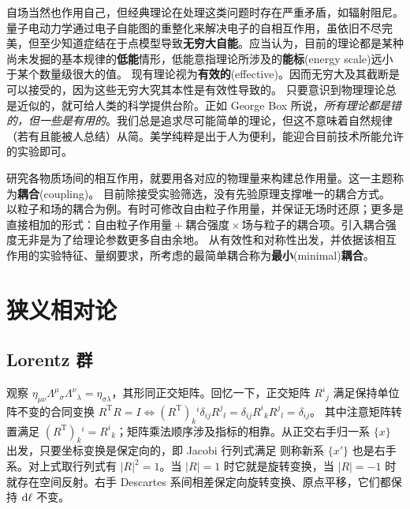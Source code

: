 自场当然也作用自己，但经典理论在处理这类问题时存在严重矛盾，如辐射阻尼。量子电动力学通过电子自能图的重整化来解决电子的自相互作用，虽依旧不尽完美，但至少知道症结在于点模型导致\textbf{无穷大自能}。应当认为，目前的理论都是某种尚未发掘的基本规律的\textbf{低能}情形，低能意指理论所涉及的\textbf{能标}(energy scale)远小于某个数量级很大的值。
现有理论视为\textbf{有效的}(effective)。因而无穷大及其截断是可以接受的，因为这些无穷大究其本性是有效性导致的。
只要意识到物理理论总是近似的，就可给人类的科学提供台阶。正如 George Box 所说，\textit{所有理论都是错的，但一些是有用的}。我们总是追求尽可能简单的理论，但这不意味着自然规律（若有且能被人总结）从简。美学纯粹是出于人为便利，能迎合目前技术所能允许的实验即可。

研究各物质场间的相互作用，就要用各对应的物理量来构建总作用量。这一主题称为\textbf{耦合}(coupling)。
目前除接受实验筛选，没有先验原理支撑唯一的耦合方式。
以粒子和场的耦合为例。有时可修改自由粒子作用量，并保证无场时还原；更多是直接相加的形式：$\text{自由粒子作用量}+\textbf{耦合强度}\times\text{场与粒子的耦合项}$。引入耦合强度无非是为了给理论参数更多自由余地。
从有效性和对称性出发，并依据该相互作用的实验特征、量纲要求，所考虑的最简单耦合称为\textbf{最小}(minimal)\textbf{耦合}。

\section{狭义相对论}
\subsection{Lorentz 群}
观察 $\eta_{\mu\nu}\Lambda^{\mu}{}_{\sigma}{\Lambda^{\nu}}_{\lambda}={\eta}_{\sigma\lambda}$，其形同正交矩阵。回忆一下，正交矩阵 $R^i{}_j$ 满足保持单位阵不变的合同变换 $R^\mathrm{T} R = I\iff (R^\mathrm{T})_k{}^i\delta_{ij} R^j{}_l=\delta_{ij}R^i{}_k R^j{}_l=\delta_{ij}$。
其中注意矩阵转置满足 $(R^\mathrm{T})_k{}^i=R^i{}_k$；矩阵乘法顺序涉及指标的相靠。从正交右手归一系 $\{x\}$ 出发，只要坐标变换是保定向的，即 Jacobi 行列式满足
则称新系 $\{x'\}$ 也是右手系。对上式取行列式有  $|R|^2=1$。当 $|R|=1$ 时它就是旋转变换，当 $|R|=-1$ 时就存在空间反射。右手 Descartes 系间相差保定向旋转变换、原点平移，它们都保持 $\dd\ell$ 不变。

